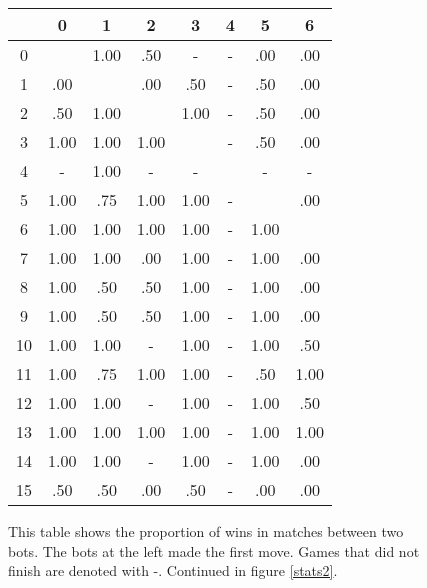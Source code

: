 \begin{figure}
\centering
\begin{tabular}{ | c |  c  c  c  c  c  c  c  | }
\hline
   &  0   &  1   &  2   &  3   &  4   &  5   &  6   \\
\hline
0  &      & 1.00 &  .50 &    - &    - &  .00 &  .00 \\
1  &  .00 &      &  .00 &  .50 &    - &  .50 &  .00 \\
2  &  .50 & 1.00 &      & 1.00 &    - &  .50 &  .00 \\
3  & 1.00 & 1.00 & 1.00 &      &    - &  .50 &  .00 \\
4  &    - & 1.00 &    - &    - &      &    - &    - \\
5  & 1.00 &  .75 & 1.00 & 1.00 &    - &      &  .00 \\
6  & 1.00 & 1.00 & 1.00 & 1.00 &    - & 1.00 &      \\
7  & 1.00 & 1.00 &  .00 & 1.00 &    - & 1.00 &  .00 \\
8  & 1.00 &  .50 &  .50 & 1.00 &    - & 1.00 &  .00 \\
9  & 1.00 &  .50 &  .50 & 1.00 &    - & 1.00 &  .00 \\
10 & 1.00 & 1.00 &    - & 1.00 &    - & 1.00 &  .50 \\
11 & 1.00 &  .75 & 1.00 & 1.00 &    - &  .50 & 1.00 \\
12 & 1.00 & 1.00 &    - & 1.00 &    - & 1.00 &  .50 \\
13 & 1.00 & 1.00 & 1.00 & 1.00 &    - & 1.00 & 1.00 \\
14 & 1.00 & 1.00 &    - & 1.00 &    - & 1.00 &  .00 \\
15 &  .50 &  .50 &  .00 &  .50 &    - &  .00 &  .00 \\
\hline
\end{tabular}
\caption{This table shows the proportion of wins in matches between
  two bots. The bots at the left made the first move. Games that did
  not finish are denoted with -. Continued in figure \ref{stats2}.}
\label{stats1}
\end{figure}

